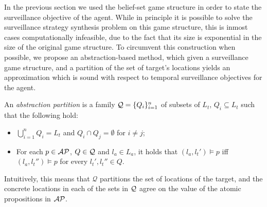 In the previous section we used the belief-set game structure in order to state the surveillance objective of the agent. While in principle it is possible to solve the surveillance strategy synthesis problem on this game structure, this is inmost cases computationally infeasible, due to the fact that its size is exponential in the size of the original game structure. To circumvent this construction when possible, we propose an abstraction-based method, which given a surveillance game structure, and a partition of the set of target's locations yields an approximation which is sound with respect to temporal surveillance objectives for the agent.


An \emph{abstraction partition} is a family $\mathcal{Q} = \{Q_i\}_{i=1}^n$ of subsets of $L_t$, $Q_i \subseteq L_t$ such that the following hold:
\begin{itemize}
\item $\bigcup_{i=1}^n Q_i = L_t$ and $Q_i \cap Q_j = \emptyset$ for $i \neq j$;
\item For each $p \in \mathcal{AP}$, $Q \in \mathcal{Q}$ and $l_a \in L_a$, it holds that $(l_a,l_t') \models p$ iff $(l_a,l_t'') \models p$ for every $l_t',l_t'' \in Q$.
\end{itemize}
Intuitively, this means that $\mathcal Q$ partitions the set of locations of the target, and the concrete locations in each of the sets in $\mathcal{Q}$ agree on the value of the atomic propositions in $\mathcal{AP}$.

